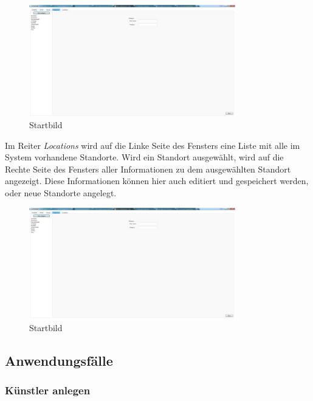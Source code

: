\documentclass[12pt, a4paper]{article}
\begin{document}
\begin{figure}[h] 	
	\centering
		\includegraphics[width=0.8\textwidth]{CategoryWindow.png}
	\caption{Startbild}
\end{figure}

Im Reiter \textit{Locations} wird auf die Linke Seite des Fensters eine Liste mit alle im System vorhandene Standorte. Wird ein Standort ausgewählt, wird auf die Rechte Seite des Fensters aller Informationen zu dem ausgewählten Standort angezeigt. Diese Informationen können hier auch editiert und gespeichert werden, oder neue Standorte angelegt.

\begin{figure}[h] 	
	\centering
		\includegraphics[width=0.8\textwidth]{LocationWindow.png}
	\caption{Startbild}
\end{figure}

\subsection{Anwendungsfälle}

\subsubsection{Künstler anlegen}
\end{document}
